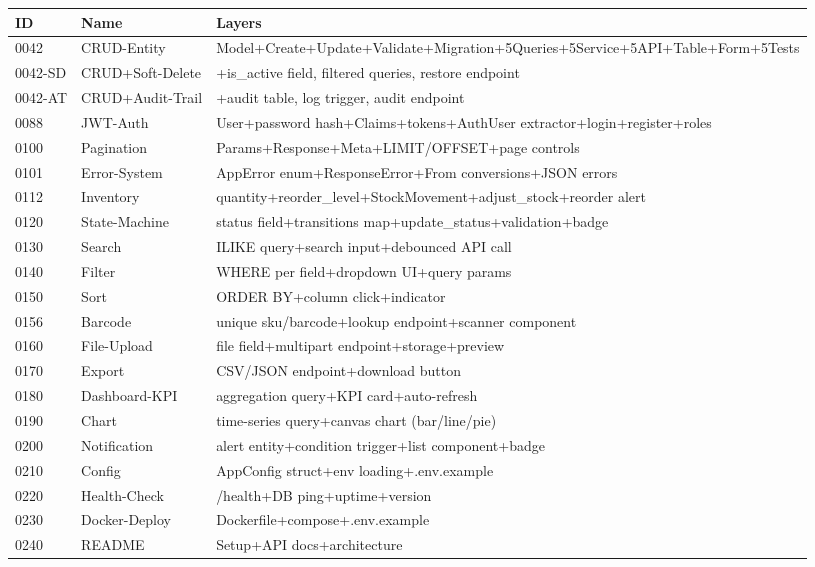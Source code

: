 \documentclass[11pt,a4paper]{article}
\begin{document}
\begin{center}
\scriptsize
\begin{tabular}{llp{6.5cm}}
\toprule
\textbf{ID} & \textbf{Name} & \textbf{Layers} \\
\midrule
0042 & CRUD-Entity & Model+Create+Update+Validate+Migration+5Queries+5Service+5API+Table+Form+5Tests \\
0042-SD & CRUD+Soft-Delete & +is\_active field, filtered queries, restore endpoint \\
0042-AT & CRUD+Audit-Trail & +audit table, log trigger, audit endpoint \\
0088 & JWT-Auth & User+password hash+Claims+tokens+AuthUser extractor+login+register+roles \\
0100 & Pagination & Params+Response+Meta+LIMIT/OFFSET+page controls \\
0101 & Error-System & AppError enum+ResponseError+From conversions+JSON errors \\
0112 & Inventory & quantity+reorder\_level+StockMovement+adjust\_stock+reorder alert \\
0120 & State-Machine & status field+transitions map+update\_status+validation+badge \\
0130 & Search & ILIKE query+search input+debounced API call \\
0140 & Filter & WHERE per field+dropdown UI+query params \\
0150 & Sort & ORDER BY+column click+indicator \\
0156 & Barcode & unique sku/barcode+lookup endpoint+scanner component \\
0160 & File-Upload & file field+multipart endpoint+storage+preview \\
0170 & Export & CSV/JSON endpoint+download button \\
0180 & Dashboard-KPI & aggregation query+KPI card+auto-refresh \\
0190 & Chart & time-series query+canvas chart (bar/line/pie) \\
0200 & Notification & alert entity+condition trigger+list component+badge \\
0210 & Config & AppConfig struct+env loading+.env.example \\
0220 & Health-Check & /health+DB ping+uptime+version \\
0230 & Docker-Deploy & Dockerfile+compose+.env.example \\
0240 & README & Setup+API docs+architecture \\
\bottomrule
\end{tabular}
\end{center}
\end{document}
